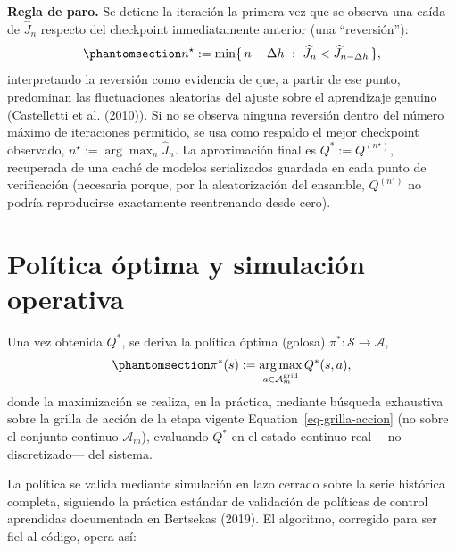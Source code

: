 \documentclass[
  letterpaper,
  DIV=11,
  numbers=noendperiod]{scrreprt}
\theoremstyle{definition}
\theoremstyle{remark}
\begin{document}
\textbf{Regla de paro.} Se detiene la iteración la primera vez que se
observa una caída de \(\widehat J_n\) respecto del checkpoint
inmediatamente anterior (una ``reversión''):
\begin{equation}\protect\phantomsection\label{eq-criterio-paro}{
n^\star := \min\{\, n-\Delta h \ :\ \widehat J_{n} < \widehat J_{n-\Delta h} \,\},
}\end{equation} interpretando la reversión como evidencia de que, a
partir de ese punto, predominan las fluctuaciones aleatorias del ajuste
sobre el aprendizaje genuino (Castelletti et al. (2010)). Si no se
observa ninguna reversión dentro del número máximo de iteraciones
permitido, se usa como respaldo el mejor checkpoint observado,
\(n^\star:=\arg\max_n \widehat J_n\). La aproximación final es
\(Q^{*}:=Q^{(n^\star)}\), recuperada de una caché de modelos
serializados guardada en cada punto de verificación (necesaria porque,
por la aleatorización del ensamble, \(Q^{(n^\star)}\) no podría
reproducirse exactamente reentrenando desde cero).

\section{Política óptima y simulación operativa}\label{sec-simulacion}

Una vez obtenida \(Q^{*}\), se deriva la política óptima (golosa)
\(\pi^{*}:\mathcal S\to\mathcal A\),
\begin{equation}\protect\phantomsection\label{eq-politica-optima}{
\pi^{*}(s) := \operatorname*{arg\,max}_{a\in\mathcal A_m^{\text{grid}}} Q^{*}(s,a),
}\end{equation} donde la maximización se realiza, en la práctica,
mediante búsqueda exhaustiva sobre la grilla de acción de la etapa
vigente Equation~\ref{eq-grilla-accion} (no sobre el conjunto continuo
\(\mathcal A_m\)), evaluando \(Q^{*}\) en el estado continuo real ---no
discretizado--- del sistema.

La política se valida mediante simulación en lazo cerrado sobre la serie
histórica completa, siguiendo la práctica estándar de validación de
políticas de control aprendidas documentada en Bertsekas (2019). El
algoritmo, corregido para ser fiel al código, opera así:
\end{document}
